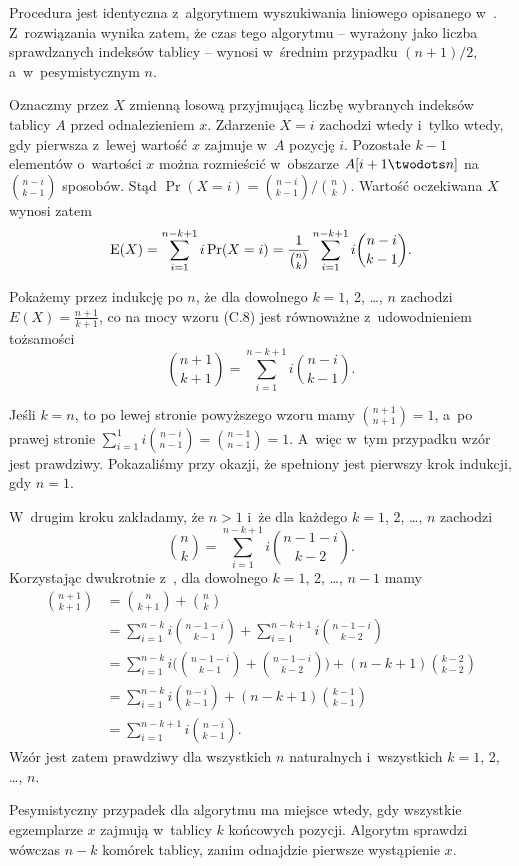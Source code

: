 \subproblem %
Procedura  jest identyczna z~algorytmem wyszukiwania liniowego opisanego w~.
Z~rozwiązania  wynika zatem, że czas tego algorytmu -- wyrażony jako liczba sprawdzanych indeksów tablicy -- wynosi w~średnim przypadku $(n+1)/2$, a~w~pesymistycznym $n$.

\subproblem %
Oznaczmy przez $X$ zmienną losową przyjmującą liczbę wybranych indeksów tablicy $A$ przed odnalezieniem $x$.
Zdarzenie $X=i$ zachodzi wtedy i~tylko wtedy, gdy pierwsza z~lewej wartość $x$ zajmuje w~$A$ pozycję $i$.
Pozostałe $k-1$ elementów o~wartości $x$ można rozmieścić w~obszarze $A[i+1\twodots n]$ na $\binom{n-i}{k-1}$ sposobów.
Stąd $\Pr(X=i)=\binom{n-i}{k-1}/\binom{n}{k}$.
Wartość oczekiwana $X$ wynosi zatem
\[
    \operatorname{E}(X) = \sum_{i=1}^{n-k+1}i\Pr(X=i) = \frac{1}{\binom{n}{k}}\sum_{i=1}^{n-k+1}i\binom{n-i}{k-1}.
\]

Pokażemy przez indukcję po $n$, że dla dowolnego $k=1$, 2, \dots, $n$ zachodzi $E(X)=\frac{n+1}{k+1}$, co na mocy wzoru (C.8) jest równoważne z~udowodnieniem tożsamości
\[
    \binom{n+1}{k+1} = \sum_{i=1}^{n-k+1}i\binom{n-i}{k-1}.
\]

Jeśli $k=n$, to po lewej stronie powyższego wzoru mamy $\binom{n+1}{n+1}=1$, a~po prawej stronie $\sum_{i=1}^1i\binom{n-i}{n-1}=\binom{n-1}{n-1}=1$.
A~więc w~tym przypadku wzór jest prawdziwy.
Pokazaliśmy przy okazji, że spełniony jest pierwszy krok indukcji, gdy $n=1$.

W~drugim kroku zakładamy, że $n>1$ i~że dla każdego $k=1$, 2, \dots, $n$ zachodzi
\[
    \binom{n}{k} = \sum_{i=1}^{n-k+1}i\binom{n-1-i}{k-2}.
\]
Korzystając dwukrotnie z~, dla dowolnego $k=1$, 2, \dots, $n-1$ mamy
\begin{align*}
    \binom{n+1}{k+1} &= \binom{n}{k+1}+\binom{n}{k} \\
	&= \sum_{i=1}^{n-k}i\binom{n-1-i}{k-1}+\sum_{i=1}^{n-k+1}i\binom{n-1-i}{k-2} \\
	&= \sum_{i=1}^{n-k}i\biggl(\binom{n-1-i}{k-1}+\binom{n-1-i}{k-2}\biggr)+(n-k+1)\binom{k-2}{k-2} \\
	&= \sum_{i=1}^{n-k}i\binom{n-i}{k-1}+(n-k+1)\binom{k-1}{k-1} \\
	&= \sum_{i=1}^{n-k+1}i\binom{n-i}{k-1}.
\end{align*}
Wzór jest zatem prawdziwy dla wszystkich $n$ naturalnych i~wszystkich $k=1$, 2, \dots, $n$.

Pesymistyczny przypadek dla algorytmu  ma miejsce wtedy, gdy wszystkie egzemplarze $x$ zajmują w~tablicy $k$ końcowych pozycji.
Algorytm sprawdzi wówczas $n-k$ komórek tablicy, zanim odnajdzie pierwsze wystąpienie $x$.

